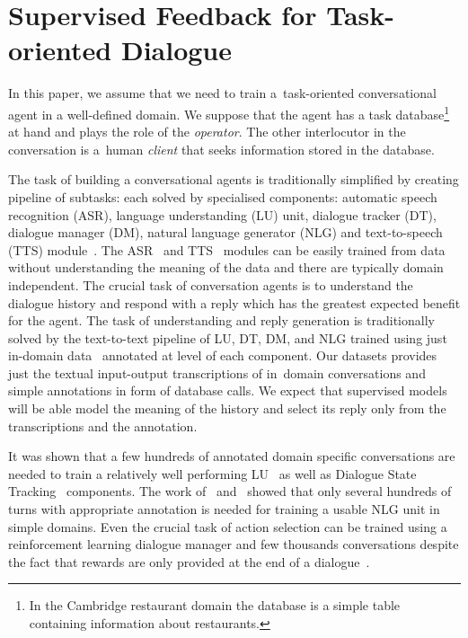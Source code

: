 \documentclass[runningheads,a4paper]{llncs}
\def\OD#1{{\color{darkgreen}OD: \it #1}}
\begin{document}

\section{Supervised Feedback for Task-oriented Dialogue} \label{sec:repre}
\vspace{-0.50em}
In this paper, we assume that we need to train a~task-oriented conversational agent in a well-defined domain.
We suppose that the agent has a task database\footnote{In the Cambridge restaurant domain the database is a simple table containing information about restaurants.} at hand and plays the role of the {\it operator}.
The other interlocutor in the conversation is a~human {\it client} that seeks information stored in the database.

The task of building a conversational agents is traditionally simplified by creating pipeline of subtasks: each solved by specialised components: automatic speech recognition (ASR), language understanding (LU) unit, dialogue tracker (DT), dialogue manager (DM), natural language generator (NLG) and text-to-speech (TTS) module~\cite{duvsek2014alex}.
The ASR~\cite{platek2014free} and TTS~\cite{taylor2009text} modules can be easily trained from data without understanding the meaning of the data and there are typically domain independent.
The crucial task of conversation agents is to understand the dialogue history and respond with a reply which has the greatest expected benefit for the agent.
The task of understanding and reply generation is traditionally solved by the text-to-text pipeline of LU, DT, DM, and NLG trained using just in-domain data~\cite{gasic2011line,jurvcivcek2014factored,duvsek2016sequence} annotated at level of each component.
Our datasets provides just the textual input-output transcriptions of in~domain conversations and simple annotations in form of database calls.
We expect that supervised models will be able model the meaning of the history and select its reply only from the transcriptions and the annotation.

It was shown that a few hundreds of annotated domain specific conversations are needed to train a relatively well performing LU~\cite{jurvcivcek2014factored} as well as Dialogue State Tracking~\cite{young2010hidden} components.
The work of~\cite{duvsek2016sequence} and~\cite{mairesse2010phrase} showed that only several hundreds of turns with appropriate annotation is needed for training a usable NLG unit in simple domains.
Even the crucial task of action selection can be trained using a reinforcement learning dialogue manager and few thousands conversations despite the fact that rewards are only provided at the end of a dialogue~\cite{gasic2011line}.
\end{document}
